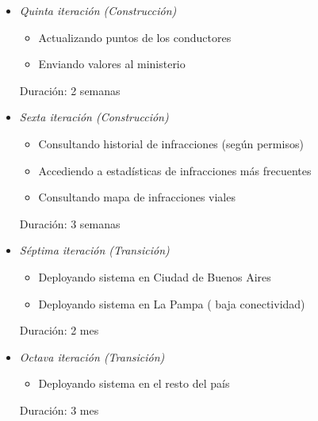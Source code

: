 \begin{itemize}
\item \textit{Quinta iteración (Construcción)}
\begin{itemize}
\item Actualizando puntos de los conductores 
\item Enviando valores al ministerio 
\end{itemize}

Duración: 2 semanas

\item \textit{Sexta iteración (Construcción)}
\begin{itemize}
\item Consultando historial de infracciones (según permisos) 
\item Accediendo a estadísticas de infracciones más frecuentes 
\item Consultando mapa de infracciones viales 
\end{itemize}

Duración: 3 semanas

\item \textit{Séptima iteración (Transición)}
\begin{itemize}
\item Deployando sistema en Ciudad de Buenos Aires 
\item Deployando sistema en La Pampa ( baja conectividad) 
\end{itemize}

Duración: 2 mes

\item \textit{Octava iteración (Transición)}
\begin{itemize}
\item Deployando sistema en el resto del país
\end{itemize}

Duración: 3 mes

\end{itemize}